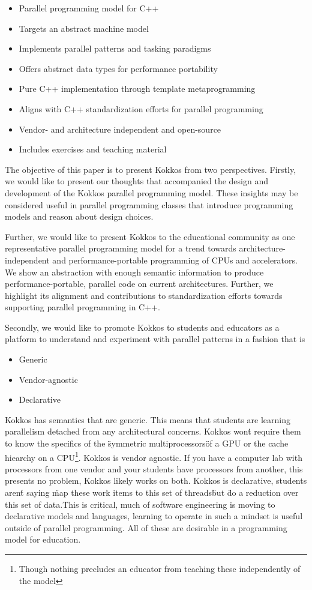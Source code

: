 \begin{itemize}
\item Parallel programming model for C++
\item Targets an abstract machine model
\item Implements parallel patterns and tasking paradigms
\item Offers abstract data types for performance portability
\item Pure C++ implementation through template metaprogramming
\item Aligns with C++ standardization efforts for parallel programming
\item Vendor- and architecture independent and open-source
\item Includes exercises and teaching material
\end{itemize}

The objective of this paper is to present Kokkos from two perspectives. Firstly, we would like to present our thoughts that accompanied the design and development of the Kokkos parallel programming model. These insights may be considered useful in parallel programming classes that introduce programming models and reason about design choices.

Further, we would like to present Kokkos to the educational community as one representative parallel programming model for a trend towards architecture-independent and performance-portable programming of CPUs and accelerators. We show an abstraction with enough semantic information to produce performance-portable, parallel code on current architectures. Further, we highlight its alignment and contributions to standardization efforts towards supporting parallel programming in C++. 

Secondly, we would like to promote Kokkos to students and educators as a platform to understand and experiment with parallel patterns in a fashion that is

\begin{itemize}
\item Generic
\item Vendor-agnostic
\item Declarative
\end{itemize}

Kokkos has semantics that are generic. This means that students are learning parallelism detached from any architectural concerns. Kokkos won\'t require them to know the specifics of the \"symmetric multiprocessors\" of a GPU or the cache hiearchy on a CPU\footnote{Though nothing precludes an educator from teaching these independently of the model}. Kokkos is vendor agnostic. If you have a computer lab with processors from one vendor and your students have processors from another, this presents no problem, Kokkos likely works on both. Kokkos is declarative, students aren\'t saying \"map these work items to this set of threads\" but \"do a reduction over this set of data.\" This is critical, much of software engineering is moving to declarative models and languages, learning to operate in such a mindset is useful outside of parallel programming. All of these are desirable in a programming model for education.

